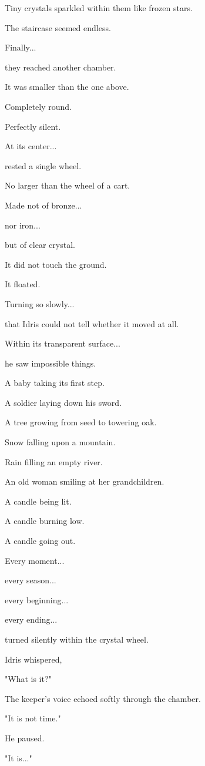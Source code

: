 \documentclass[12pt,openany]{book}
\begin{document}
Tiny crystals sparkled within them like frozen stars.

The staircase seemed endless.

Finally...

they reached another chamber.

It was smaller than the one above.

Completely round.

Perfectly silent.

At its center...

rested a single wheel.

No larger than the wheel of a cart.

Made not of bronze...

nor iron...

but of clear crystal.

It did not touch the ground.

It floated.

Turning so slowly...

that Idris could not tell whether it moved at all.

Within its transparent surface...

he saw impossible things.

A baby taking its first step.

A soldier laying down his sword.

A tree growing from seed to towering oak.

Snow falling upon a mountain.

Rain filling an empty river.

An old woman smiling at her grandchildren.

A candle being lit.

A candle burning low.

A candle going out.

Every moment...

every season...

every beginning...

every ending...

turned silently within the crystal wheel.

Idris whispered,

"What is it?"

The keeper's voice echoed softly through the chamber.

"It is not time."

He paused.

"It is..."
\end{document}
